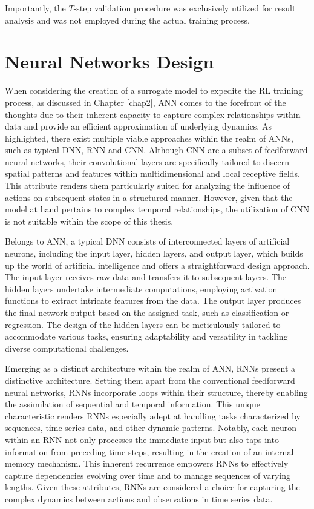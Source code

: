 Importantly, the $T$-step validation procedure was exclusively utilized for result analysis and was not employed during the actual training process.

\section{Neural Networks Design}
\label{sec:NN_design}
When considering the creation of a surrogate model to expedite the RL training process, as discussed in Chapter \ref{chap2}, \ac{ANN} comes to the forefront of the thoughts due to their inherent capacity to capture complex relationships within data and provide an efficient approximation of underlying dynamics\cite{zouOverviewArtificialNeural2009}. As highlighted, there exist multiple viable approaches within the realm of \ac{ANN}s, such as typical \ac{DNN}, \ac{RNN} and \ac{CNN}. Although \ac{CNN}  are a subset of feedforward neural networks, their convolutional layers are specifically tailored to discern spatial patterns and features within multidimensional and local receptive fields. This attribute renders them particularly suited for analyzing the influence of actions on subsequent states in a structured manner. However, given that the model at hand pertains to complex temporal relationships, the utilization of \ac{CNN} is not suitable within the scope of this thesis.

Belongs to \ac{ANN}, a typical \ac{DNN} consists of interconnected layers of artificial neurons, including the input layer, hidden layers, and output layer, which builds up the world of artificial intelligence and offers a straightforward design approach. The input layer receives raw data and transfers it to subsequent layers. The hidden layers undertake intermediate computations, employing activation functions to extract intricate features from the data. The output layer produces the final network output based on the assigned task, such as classification or regression. The design of the hidden layers can be meticulously tailored to accommodate various tasks, ensuring adaptability and versatility in tackling diverse computational challenges. 

Emerging as a distinct architecture within the realm of \ac{ANN}, \ac{RNN}s present a distinctive architecture. Setting them apart from the conventional feedforward neural networks, \ac{RNN}s incorporate loops within their structure, thereby enabling the assimilation of sequential and temporal information. This unique characteristic renders \ac{RNN}s especially adept at handling tasks characterized by sequences, time series data, and other dynamic patterns\cite{liptonCriticalReviewRecurrent2015}. Notably, each neuron within an \ac{RNN} not only processes the immediate input but also taps into information from preceding time steps, resulting in the creation of an internal memory mechanism. This inherent recurrence empowers \ac{RNN}s to effectively capture dependencies evolving over time and to manage sequences of varying lengths\cite{sherstinskyFundamentalsRecurrentNeural2020}. Given these attributes, \ac{RNN}s are considered a choice for capturing the complex dynamics between actions and observations in time series data.

